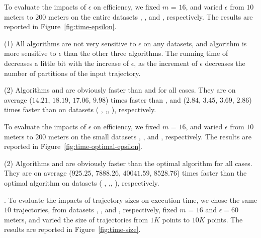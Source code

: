 To evaluate the impacts of $\epsilon$ on efficiency, we fixed $m$ = $16$,
and varied $\epsilon$  from $10$ meters to $200$ meters on the entire
datasets \sercar, \geolife, \mopsi and \pricar, respectively.
The results are reported in Figure~\ref{fig:time-epsilon}.

\ni(1) All algorithms are not very sensitive to $\epsilon$ on any datasets, and algorithm \dps is more sensitive to $\epsilon$ than the other three algorithms.
The running time of \dps decreases a little bit with the increase of $\epsilon$, as the increment of $\epsilon$ decreases the number of partitions of the input trajectory.


\ni(2) Algorithms \cist and \cista are obviously faster than \dps and \squishe for all cases.
They are on average ($14.21$, $18.19$, $17.06$, $9.98$) times faster than \dps,
and ($2.84$, $3.45$, $3.69$, $2.86$) times faster than \squishe on
{datasets} ( \sercar, {\geolife},\mopsi, \pricar), respectively.

To evaluate the impacts of $\epsilon$ on efficiency, we fixed $m$ = $16$,
and varied $\epsilon$  from $10$ meters to $200$ meters on
the small datasets \sercar, \geolife, \mopsi and \pricar, respectively.
The results are reported in Figure~\ref{fig:time-optimal-epsilon}.

\ni(2) Algorithms \cist and \cista are obviously faster than the optimal algorithm for all cases.
They are on average ($925.25$, $7888.26$, $40041.59$, $8528.76$) times faster than the optimal algorithm on
{datasets} ( \sercar, {\geolife},\mopsi, \pricar), respectively.

.
To evaluate the impacts of trajectory sizes on execution time,
we chose the same {$10$} trajectories, from {datasets} \sercar, \geolife, \mopsi and \pricar, respectively,
fixed $m$ = $16$ and $\epsilon = 60$ meters, and varied the size  of trajectories from $1K$ points to $10K$ points.
%
The results are reported in Figure~\ref{fig:time-size}.

